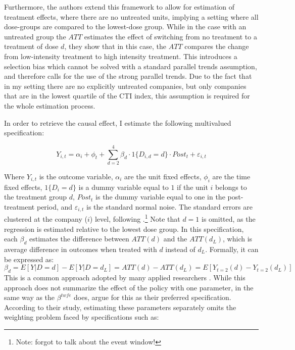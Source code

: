 \documentclass[12pt]{article}
\begin{document}
Furthermore, the authors extend this framework to allow for estimation of treatment effects, where there are no untreated units, implying a setting where all dose-groups are compared to the lowest-dose group. While in the case with an untreated group the $ATT$ estimates the effect of switching from no treatment to a treatment of dose $d$, they show that in this case, the $ATT$ compares the change from low-intensity treatment to high intensity treatment. This introduces a selection bias which cannot be solved with a standard parallel trends assumption, and therefore calls for the use of the strong parallel trends. Due to the fact that in my setting there are no explicitly untreated companies, but only companies that are in the lowest quartile of the CTI index, this assumption is required for the whole estimation process.

In order to retrieve the causal effect, I estimate the following multivalued specification:

\begin{equation}
    Y_{i,t} = \alpha_i + \phi_t + \sum_{d=2}^{4} \beta_d \cdot 1\{D_{i,d}=d\}\cdot Post_t + \varepsilon_{i,t}
\end{equation}

Where $Y_{i,t}$ is the outcome variable, $\alpha_i$ are the unit fixed effects, $\phi_i$ are the time fixed effects, $1\{D_{i}=d\}$ is a dummy variable equal to $1$ if the unit $i$ belongs to the treatment group $d$, $Post_t$ is the dummy variable equal to one in the post-treatment period, and $\varepsilon_{i,t}$ is the standard normal noise. The standard errors are clustered at the company ($i$) level, following \textcite{abadieWhenShouldYou2022}.\footnote{Note: forgot to talk about the event window!} Note that $d=1$ is omitted, as the regression is estimated relative to the lowest dose group. In this specification, each $\beta_d$ estimates the difference between $ATT(d)$ and the $ATT(d_L)$, which is average difference in outcomes when treated with $d$ instead of $d_L$. Formally, it can be expressed as: 
\begin{equation}
    \beta_d = E[Y|D = d] - E[Y |D = d_L] = ATT(d) - ATT(d_L) = E[Y_{t=2}(d) - Y_{t=2}(d_L)]
\end{equation}
This is a common approach adopted by many applied researchers \parencite{acemoglu_finkelstein_medicare,deschenes_greenstone_clim_change}. While this approach does not summarize the effect of the policy with one parameter, in the same way as the $\beta^{twfe}$ does, \citeauthor{callawayDifferenceinDifferencesContinuousTreatment2025} argue for this as their preferred specification. According to their study, estimating these parameters separately omits the weighting problem faced by specifications such as:
\end{document}
